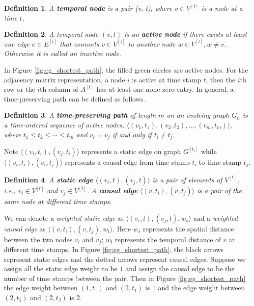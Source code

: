 \documentclass[12pt]{article}
\newtheorem{definition}{Definition}
\theoremstyle{definition}
\begin{document}
\begin{definition}
  A \textbf{temporal node} is a pair (v, t), where $v \in V^{[t]}$ is a node at a time $t$.
\end{definition}


\begin{definition}
  A temporal node $(v, t)$ is an \textbf{active node} if there exists at least one edge $e \in E^{[t]}$ that connects $v \in V^{[t]}$ to another node $w \in V^{[t]}, w\ne v$. Otherwise it is called an inactive node.
\end{definition}

In Figure \ref{fig:eg_shortest_path}, the filled green circles are active nodes. For the adjacency matrix representation, a node $i$ is active at time stamp $t$, then
the $i$th row or the $i$th column of $A^{[t]}$ has at least one none-zero entry.
 In general, a time-preserving path can be defined as follows.

\begin{definition}
A \textbf{time-preserving path}  of length $m$ on an evolving graph $G_n$ is a time-ordered sequence of active nodes, $\langle (v_1, t_1), (v_2, t_2), \ldots, (v_m, t_m) \rangle$, where $t_1 \le t_2 \le \cdots \le t_m$ and
$v_i = v_j$ if and only if $t_i \ne t_j$.
\end{definition}

Note $\langle (v_i, t_i), (v_j, t_i) \rangle$ represents a static edge on graph $G^{[t_i]}$ while $\langle (v_i, t_i), (v_i, t_j) \rangle$ represents a causal edge from time stamp $t_i$ to time stamp $t_j$.

\begin{definition}
A \textbf{static edge} $\langle (v_i, t), (v_j, t)\rangle$ is a pair of elements of $V^{[t]}$, i.e., $v_i \in V^{[t]}$ and
$v_j \in V^{[t]}$.
 A \textbf{causal edge} $\langle (v, t_i), (v, t_j)\rangle$ is a pair of the same node at different time stamps.
\end{definition}

We can denote a \emph{weighted static edge} as $\langle (v_i, t), (v_j, t), w_s \rangle$ and a \emph{weighted causal edge} as $\langle (v, t_i), (v, t_j), w_t \rangle$.
Here $w_s$ represents the spatial distance between the two nodes $v_i$ and $v_j$; $w_t$ represents the
temporal distance of $v$ at different time stamps.
In Figure \ref{fig:eg_shortest_path}, the black arrows represent static edges and the dotted arrows represent causal edges.
Suppose we assign all the static edge weight to be $1$ and
assign the causal edge to be the number of time stamps between the pair. Then in Figure \ref{fig:eg_shortest_path}
the edge weight between $(1, t_1)$ and $(2, t_1)$ is $1$ and the edge weight between $(2, t_1)$ and $(2, t_3)$
 is $2$.
\end{document}
